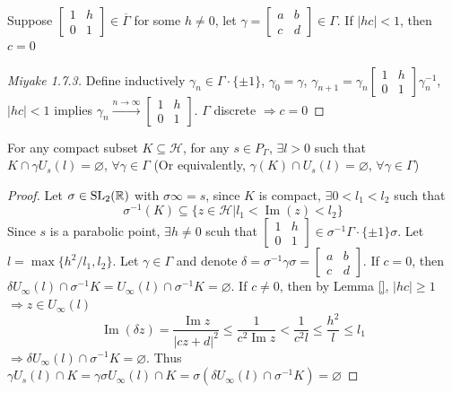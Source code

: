 \documentclass[main]{subfiles}
\begin{document}
\begin{lemma}
Suppose $\begin{bmatrix}
1&h \\
0&1
\end{bmatrix}\in\overline\Gamma$ for some $h\neq0$, let $\gamma=\begin{bmatrix}
a&b\\
c&d
\end{bmatrix}\in\Gamma$. If $|hc|<1$, then $c=0$
\end{lemma}

\begin{proof}[Miyake 1.7.3]
Define inductively $\gamma_n\in\Gamma\cdot\{\pm1\}$, $\gamma_0=\gamma$, $\gamma_{n+1}=\gamma_n\begin{bmatrix}
1&h \\
0&1
\end{bmatrix}\gamma_n^{-1}$, $|hc|<1$ implies $\gamma_n\xrightarrow{n\to\infty}\begin{bmatrix}
1&h \\
0&1
\end{bmatrix}$. $\Gamma$ discrete $\Rightarrow c=0$
\end{proof}

\begin{lemma}
For any compact subset $K\subseteq\mathcal H$, for any $s\in P_\Gamma$, $\exists l>0$ such that $K\cap\gamma U_s(l)=\varnothing$, $\forall\gamma\in\Gamma$ (Or equivalently, $\gamma(K)\cap U_s(l)=\varnothing$, $\forall\gamma\in\Gamma$)
\end{lemma}

\begin{proof}
Let $\sigma\in\operatorname{SL}_2(\mathbb R)$ with $\sigma\infty=s$, since $K$ is compact, $\exists0<l_1<l_2$ such that
\[\sigma^{-1}(K)\subseteq\{z\in\mathcal H|l_1<\operatorname{Im}(z)<l_2\}\]
Since $s$ is a parabolic point, $\exists h\neq0$ scuh that $\begin{bmatrix}
1&h \\
0&1
\end{bmatrix}\in\sigma^{-1}\Gamma\cdot\{\pm1\}\sigma$. Let $l=\max\{h^2/l_1,l_2\}$. Let $\gamma\in\Gamma$ and denote $\delta=\sigma^{-1}\gamma\sigma=\begin{bmatrix}
a&b \\
c&d
\end{bmatrix}$. If $c=0$, then $\delta U_\infty(l)\cap\sigma^{-1}K=U_\infty(l)\cap\sigma^{-1}K=\varnothing$. If $c\neq0$, then by Lemma \ref{}, $|hc|\geq1$ $\Rightarrow z\in U_\infty(l)$
\[\operatorname{Im}(\delta z)=\frac{\operatorname{Im}z}{|cz+d|^2}\leq\frac{1}{c^2\operatorname{Im}z}<\frac{1}{c^2l}\leq\frac{h^2}{l}\leq l_1\]
$\Rightarrow\delta U_\infty(l)\cap\sigma^{-1}K=\varnothing$. Thus $\gamma U_s(l)\cap K=\gamma\sigma U_\infty(l)\cap K=\sigma(\delta U_\infty(l)\cap\sigma^{-1}K)=\varnothing$
\end{proof}
\end{document}
